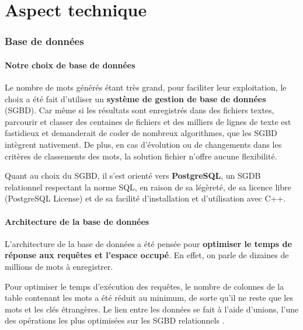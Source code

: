 \part{Aspect technique}
\label{technique}

\section{Base de données}
\label{sec:technique/bdd}

\subsection{Notre choix de base de données}
\label{subsec:technique/bdd/choix}
\par
Le nombre de mots générés étant très grand, pour faciliter leur exploitation, le choix a été fait d'utiliser un \textbf{système de gestion de base de données} (SGBD). Car même si les résultats sont enregistrés dans des fichiers textes, parcourir et classer des centaines de fichiers et des milliers de lignes de texte est fastidieux et demanderait de coder de nombreux algorithmes, que les SGBD intègrent nativement. De plus, en cas d'évolution ou de changements dans les critères de classements des mots, la solution fichier n'offre aucune flexibilité.
\par
Quant au choix du SGBD, il s'est orienté vers \textbf{PostgreSQL}, un SGDB relationnel respectant la norme SQL, en raison de sa légèreté, de sa licence libre (PostgreSQL License) et de sa facilité d'installation et d'utilisation avec C++.

\subsection{Architecture de la base de données}
\label{subsec:technique/bdd/architecture}
\par
L'architecture de la base de données a été pensée pour \textbf{optimiser le temps de réponse aux requêtes et l'espace occupé}. En effet, on parle de dizaines de millions de mots à enregistrer.
\par
Pour optimiser le temps d'exécution des requêtes, le nombre de colonnes de la table contenant les mots a été réduit au minimum, de sorte qu'il ne reste que les mots et les clés étrangères. Le lien entre les données se fait à l'aide d'unions, l'une des opérations les plus optimisées sur les SGBD relationnels \cite{BROU2012}.

